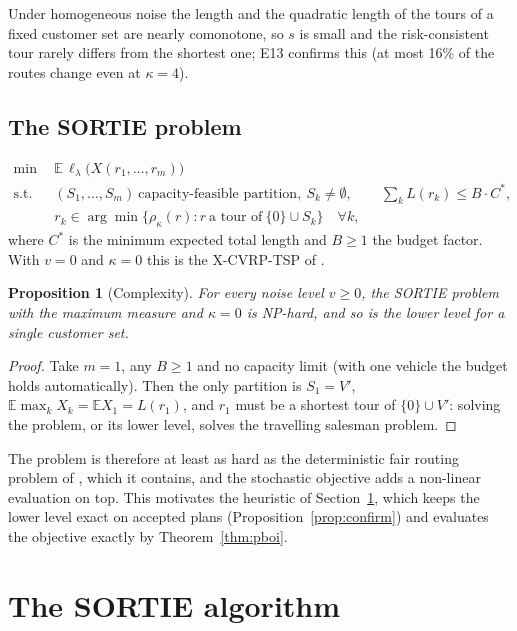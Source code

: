 \documentclass[11pt]{article}
\newtheorem{proposition}[theorem]{Proposition}
\theoremstyle{definition}
\newcommand{\E}{\mathbb{E}}
\newcommand{\lord}{\ell_\lambda}
\begin{document}
Under homogeneous noise the length and the quadratic length of the tours of a
fixed customer set are nearly comonotone, so $s$ is small and the
risk-consistent tour rarely differs from the shortest one; E13 confirms this
(at most 16\% of the routes change even at $\kappa=4$).

\subsection{The SORTIE problem}\label{sec:th:problem}
\begin{align*}
\min\ \ & \E\,\lord\big(X(r_1,\dots,r_m)\big)\\
\text{s.t.}\ \ & (S_1,\dots,S_m)\ \text{capacity-feasible partition},\ S_k\ne\emptyset,\qquad
\textstyle\sum_kL(r_k)\le B\cdot C^\ast,\\
& r_k\in\arg\min\{\rho_\kappa(r): r\ \text{a tour of}\ \{0\}\cup S_k\}\quad\forall k,
\end{align*}
where $C^\ast$ is the minimum expected total length and $B\ge1$ the budget
factor. With $v=0$ and $\kappa=0$ this is the X-CVRP-TSP of \citet{ljubic2026fair}.

\begin{proposition}[Complexity]\label{prop:np}
For every noise level $v\ge0$, the SORTIE problem with the maximum measure and
$\kappa=0$ is NP-hard, and so is the lower level for a single customer set.
\end{proposition}
\begin{proof}
Take $m=1$, any $B\ge1$ and no capacity limit (with one vehicle the budget
holds automatically). Then the only partition is
$S_1=V'$, $\E\max_kX_k=\E X_1=L(r_1)$, and $r_1$ must be a shortest tour of
$\{0\}\cup V'$: solving the problem, or its lower level, solves the
travelling salesman problem.
\end{proof}

The problem is therefore at least as hard as the deterministic fair routing
problem of \citet{ljubic2026fair}, which it contains, and the stochastic
objective adds a non-linear evaluation on top. This motivates the heuristic
of Section~\ref{sec:alg}, which keeps the lower level exact on accepted plans
(Proposition~\ref{prop:confirm}) and evaluates the objective exactly by
Theorem~\ref{thm:pboi}.

\section{The SORTIE algorithm}\label{sec:alg}
\end{document}
